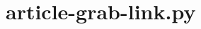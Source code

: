 \appendix
\chapter{article-grab-link.py}\label{appdx:grab-link}

\inputminted{python}{data/script/article-grab-link.py}

